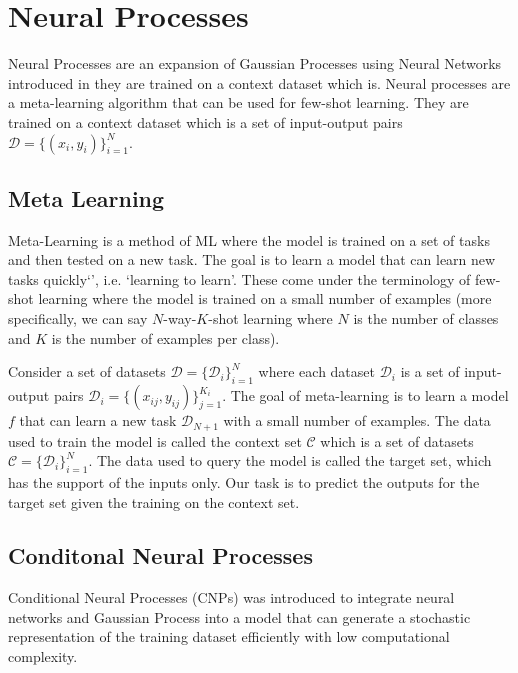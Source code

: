 \documentclass[main.tex]{subfiles}
\begin{document}
\section{Neural Processes}

Neural Processes are an expansion of Gaussian Processes using Neural Networks introduced in \cite{garnelo2018neural} they are trained on a context dataset which is. Neural processes are a meta-learning algorithm that can be used for few-shot learning. They are trained on a context dataset which is a set of input-output pairs $\mathcal{D} = \{ (x_i, y_i) \}_{i=1}^N$. 

\subsection{Meta Learning}

Meta-Learning is a method of ML where the model is trained on a set of tasks and then tested on a new task. The goal is to learn a model that can learn new tasks quickly`', i.e. `learning to learn'. These come under the terminology of few-shot learning where the model is trained on a small number of examples (more specifically, we can say $N$-way-$K$-shot learning where $N$ is the number of classes and $K$ is the number of examples per class).

Consider a set of datasets $\mathcal{D} = \{ \mathcal{D}_i \}_{i=1}^N$ where each dataset $\mathcal{D}_i$ is a set of input-output pairs $\mathcal{D}_i = \{ (x_{ij}, y_{ij}) \}_{j=1}^{K_i}$. The goal of meta-learning is to learn a model $f$ that can learn a new task $\mathcal{D}_{N+1}$ with a small number of examples. The data used to train the model is called the context set $\mathcal{C}$ which is a set of datasets $\mathcal{C} = \{ \mathcal{D}_i \}_{i=1}^N$. The data used to query the model is called the target set, which has the support of the inputs only. Our task is to predict the outputs for the target set given the training on the context set.

\subsection{Conditonal Neural Processes}

Conditional Neural Processes (CNPs) \cite{garnelo2018conditional} was introduced to integrate neural networks and Gaussian Process into a model that can generate a stochastic representation of the training dataset efficiently with low computational complexity. 


\ifSubfilesClassLoaded{%
    \printbibliography{}
}{} 
\end{document}
